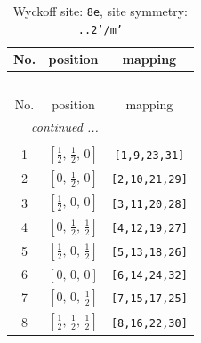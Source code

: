 \documentclass[fleqn,8pt]{jsarticle}
\begin{document}
\renewcommand{\arraystretch}{1.2}
\begin{longtable}{ccc}
\caption{Wyckoff site: {\tt 8e}, site symmetry: {\tt ..2'/m'}}
 \\
 \hline \hline
No. & position & mapping \\ \hline \endfirsthead

\multicolumn{2}{l}{\tablename\ \thetable{}} \\
 \hline \hline
No. & position & mapping \\ \hline \endhead

 \hline \hline
\multicolumn{2}{r}{\footnotesize\it continued ...} \\ \endfoot

 \hline \hline
\multicolumn{2}{r}{} \\ \endlastfoot

1 & $\left[ \frac{1}{2},\, \frac{1}{2},\, 0 \right]$ & {\tt [1,9,23,31]} \\ \hline
2 & $\left[ 0,\, \frac{1}{2},\, 0 \right]$ & {\tt [2,10,21,29]} \\ \hline
3 & $\left[ \frac{1}{2},\, 0,\, 0 \right]$ & {\tt [3,11,20,28]} \\ \hline
4 & $\left[ 0,\, \frac{1}{2},\, \frac{1}{2} \right]$ & {\tt [4,12,19,27]} \\ \hline
5 & $\left[ \frac{1}{2},\, 0,\, \frac{1}{2} \right]$ & {\tt [5,13,18,26]} \\ \hline
6 & $\left[ 0,\, 0,\, 0 \right]$ & {\tt [6,14,24,32]} \\ \hline
7 & $\left[ 0,\, 0,\, \frac{1}{2} \right]$ & {\tt [7,15,17,25]} \\ \hline
8 & $\left[ \frac{1}{2},\, \frac{1}{2},\, \frac{1}{2} \right]$ & {\tt [8,16,22,30]} \\
\end{longtable}
\renewcommand{\arraystretch}{1.2}
\end{document}
